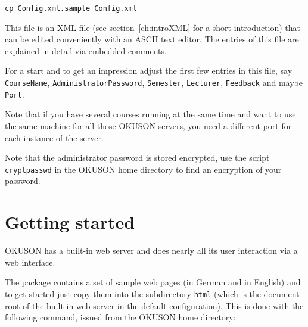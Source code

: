 \documentclass[12pt,openany,a4paper]{book}
\newcommand{\OKUSON}{\textsf{OKUSON}}
\begin{document}
\hspace*{1cm}\texttt{cp Config.xml.sample Config.xml}

This file is  an XML file (see  section~\ref{ch:introXML}
for a short introduction) that can be edited conveniently with an ASCII text
editor.  The entries of this file are explained in detail via  embedded  
comments.  

For a start and to get an impression adjust the first few entries in 
this file, say \texttt{CourseName}, \texttt{AdministratorPassword}, 
\texttt{Semester}, \texttt{Lecturer}, \texttt{Feedback} and maybe
\texttt{Port}. 

Note that if you have several courses running at the same time and want
to use the same machine for all those {\OKUSON} servers, you need a
different port for each instance of the server.

Note that the administrator password is stored encrypted, use the script
\texttt{cryptpasswd} in the {\OKUSON} home directory  to find an encryption 
of your password.



\section{Getting started}

{\OKUSON} has a built-in web server and does nearly all its user
interaction via a  web interface.

The package contains a set of sample web pages (in German and in English) 
and to get 
started just copy them into the subdirectory \texttt{html} (which is the
document root of the built-in web server in the default configuration). 
This is done with the following command, issued from the {\OKUSON} home
directory:
\end{document}
